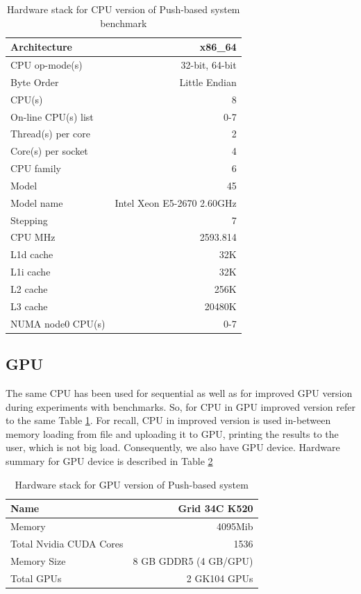\documentclass[11pt,a4paper]{report}
\begin{document}
\begin{table}[h!]
	\renewcommand*{\arraystretch}{1.5}
	\tabcolsep=0.12cm
	\centering
  \begin{tabular}{| l | r |}
   \hline
Architecture & x86\_64 \\  \hline
CPU op-mode(s) & 32-bit, 64-bit \\   \hline
Byte Order & Little Endian \\   \hline
CPU(s) & 8 \\   \hline
On-line CPU(s) list & 0-7 \\   \hline
Thread(s) per core & 2 \\   \hline
Core(s) per socket & 4 \\   \hline
CPU family & 6 \\   \hline
Model & 45 \\   \hline
Model name & Intel Xeon E5-2670 2.60GHz \\   \hline
Stepping & 7 \\   \hline
CPU MHz & 2593.814 \\  \hline  
L1d cache & 32K \\   \hline
L1i cache & 32K \\   \hline
L2 cache & 256K \\   \hline
L3 cache & 20480K \\   \hline
NUMA node0 CPU(s) & 0-7 \\  \hline
  \end{tabular}
    \caption{Hardware stack for CPU version of Push-based system benchmark}
      \label{tb:cpuhardware}
\end{table}

\subsection{GPU}

The same CPU has been used for sequential as well as for improved GPU version during experiments with benchmarks. So, for CPU in GPU improved version refer to the same Table \ref{tb:cpuhardware}. For recall, CPU in improved version is used in-between memory loading from file and uploading it to GPU, printing the results to the user, which is not big load. Consequently, we also have GPU device. Hardware summary for GPU device is described in Table \ref{tb:gpuhardware}

\begin{table}[h!]
	\renewcommand*{\arraystretch}{1.5}
	\tabcolsep=0.12cm
  \centering
  \begin{tabular}{| l | r |}
   \hline
	Name & Grid 34C K520 \\ \hline
	Memory & 4095Mib \\ \hline
	Total Nvidia CUDA Cores & 1536 \\ \hline
	Memory Size & 8 GB GDDR5 (4 GB/GPU) \\ \hline
	Total GPUs & 2 GK104 GPUs \\ \hline
  \end{tabular}
    \caption{Hardware stack for GPU version of Push-based system}
    	  \label{tb:gpuhardware}
\end{table}
\end{document}
